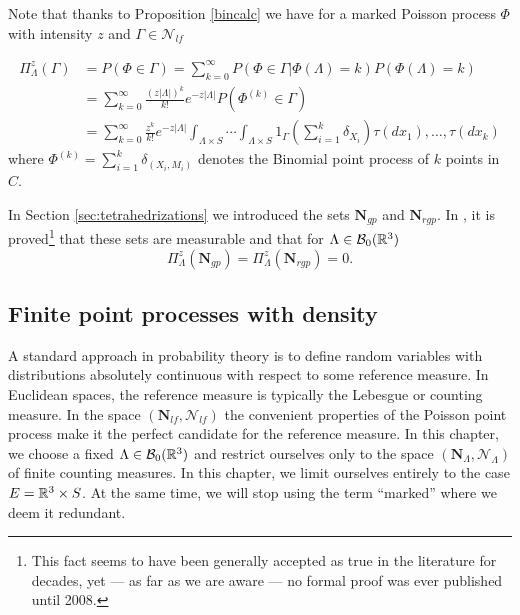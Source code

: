
Note that thanks to Proposition \ref{bincalc} we have for a marked Poisson process $\Phi$ with intensity $z$ and $\Gamma \in \mathcal N_{lf}$ 

\begin{align}\label{eq:poiscalc}
	\Pi^z_\Lambda(\Gamma) &= P(\Phi \in \Gamma) = \sum^\infty_{k=0} P(\Phi \in \Gamma | \Phi(\Lambda) = k) P(\Phi(\Lambda)=k) \\
	& = \sum^\infty_{k=0} \frac{(z|\Lambda|)^k}{k!} e^{-z|\Lambda|} P(\Phi^{(k)}\in \Gamma) \nonumber \\ 
	& = \sum^\infty_{k=0} \frac{z^k}{k!} e^{-z|\Lambda|} \int_{\Lambda\times S} \cdots \int_{\Lambda\times S} 1_{\Gamma} \left(\sum^k_{i=1} \delta_{X_i}\right) \tau(dx_1), \dots, \tau(dx_k) \nonumber
\end{align}
where $\Phi^{(k)} = \sum^k_{i=1}\delta_{(X_i,M_i)}$ denotes the Binomial point process of $k$ points in $C$.

\begin{remark}
	In Section \ref{sec:tetrahedrizations} we introduced the sets $\mathbf N_{gp}$ and $\mathbf N_{rgp}$. In \cite{Zessin2008}, it is proved\footnote{This fact seems to have been generally accepted as true in the literature for decades, yet --- as far as we are aware --- no formal proof was ever published until 2008.} that these sets are measurable and that for $\Lambda \in \mathcal B_0({\mathbb R^3})$
	$$\Pi^z_{\Lambda}(\mathbf N_{gp}) = \Pi^z_{\Lambda}(\mathbf N_{rgp})=0.$$
\end{remark}



\subsection{Finite point processes with density}\label{sec:densityPP}
A standard approach in probability theory is to define random variables with distributions absolutely continuous with respect to some reference measure. In Euclidean spaces, the reference measure is typically the Lebesgue or counting measure. In the space $(\mathbf N_{lf},\mathcal N_{lf})$ the convenient properties of the Poisson point process make it the perfect candidate for the reference measure. In this chapter, we choose a fixed $\Lambda \in \mathcal B_0({\mathbb R^3})$ and restrict ourselves only to the space $(\mathbf N_\Lambda,\mathcal N_\Lambda)$ of finite counting measures. 
In this chapter, we limit ourselves entirely to the case $E={\mathbb R^3} \times S$. At the same time, we will stop using the term ``marked'' where we deem it redundant. 

